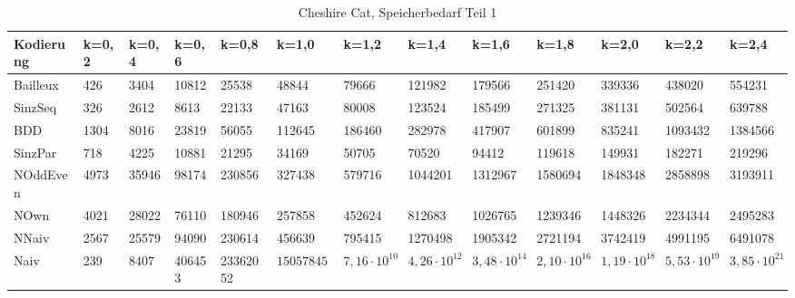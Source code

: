 \documentclass[a4,abstract=on]{scrartcl}
\begin{document}
\begin{landscape}
\begin{table}[h!]
   \end{table}
 \begin{table}[h!]
    \small
    \setlength{\tabcolsep}{0.11cm}
     \centering
     \begin{tabular}[width=\textwidth]{|l||l|l|l|l|l|l|l|l|l|l|l|l|}
	\hline
       \textbf{Kodierung}  & \textbf{k=0,2} & \textbf{k=0,4} & \textbf{k=0,6} &\textbf{k=0,8} &\textbf{k=1,0} &\textbf{k=1,2} &\textbf{k=1,4} &\textbf{k=1,6} &\textbf{k=1,8} &\textbf{k=2,0} &\textbf{k=2,2} &\textbf{k=2,4}\\
	\hline
	\hline
	Bailleux & 426 & 3404 & 10812 & 25538 & 48844 & 79666 & 121982 & 179566 & 251420 & 339336 & 438020 & 554231 \\
\hline
	SinzSeq & 326 & 2612 & 8613 & 22133 & 47163 & 80008 & 123524 & 185499 & 271325 & 381131 & 502564 & 639788 \\
\hline
	BDD & 1304 & 8016 & 23819 & 56055 & 112645 & 186460 & 282978 &417907 &601899 & 835241 & 1093432 & 1384566\\
\hline
	SinzPar & 718 & 4225 & 10881 & 21295 & 34169 & 50705 & 70520 & 94412 & 119618 & 149931 & 182271 & 219296 \\
\hline
	NOddEven & 4973 & 35946 & 98174 & 230856 & 327438 & 579716 & 1044201 & 1312967 & 1580694 & 1848348& 2858898 & 3193911\\
\hline
	NOwn & 4021 & 28022 & 76110 & 180946 & 257858 & 452624 & 812683 & 1026765 & 1239346 & 1448326 & 2234344 & 2495283\\
 \hline
	NNaiv & 2567 & 25579 & 94090 & 230614 & 456639 & 795415 & 1270498 & 1905342 & 2721194 & 3742419 & 4991195 & 6491078\\
\hline
	Naiv & 239 & 8407 &  406453 &  23362052 &  $1505784591$ &  $7,16 \cdot 10^{10}$ &  $4,26 \cdot 10^{12}$ &  $3,48 \cdot 10^{14}$ &  $2,10 \cdot 10^{16}$ &  $1,19 \cdot 10^{18}$ & $ 5,53 \cdot 10^{19}$ &  $3,85 \cdot 10^{21}$ \\
\hline
       
     \end{tabular}

     \caption{Cheshire Cat, Speicherbedarf Teil 1}
     \label{tbl:beispieltabelle}

   \end{table}


\end{landscape}
\end{document}
